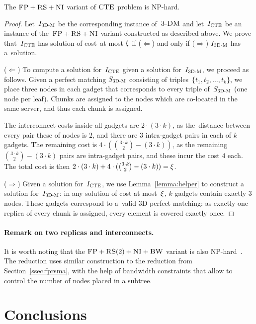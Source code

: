 \begin{theorem}
\label{theorem:fp_rs_cc}
The $\textsc{FP}+\textsc{RS}+\textsc{NI}$ variant of $\textsc{CTE}$ problem is NP-hard.
\end{theorem}
\begin{proof}
Let~$I_{\mathrm{\textsc{3D-M}}}$ be the corresponding instance of~$\textsc{3-DM}$ and let~$I_{\mathrm{\textsc{CTE}}}$ be an instance of
the~$\textsc{FP}+\textsc{RS}+\textsc{NI}$ variant constructed as described above.
We prove that~$I_{\mathrm{\textsc{CTE}}}$ has solution of cost~at most $\xi$ if ($\Leftarrow$) and only if
($\Rightarrow$)
$I_{\mathrm{\textsc{3D-M}}}$ has a~solution.

($\Leftarrow$) To compute a solution
for~$I_{\mathrm{\textsc{CTE}}}$ given a solution for~$I_{\mathrm{\textsc{3D-M}}}$, we proceed as follows.
Given a perfect matching $S_{\mathrm{\textsc{3D-M}}}$ consisting of triples~$ \{t_1, t_2,
\ldots, t_k\}$, we place three nodes in each gadget that
corresponds to every triple of~$S_{\mathrm{\textsc{3D-M}}}$ (one node per leaf). Chunks are assigned to the nodes which are co-located
in the same server, and thus each chunk is assigned.

The interconnect costs inside all gadgets are $2\cdot (3 \cdot k)$,
as the~distance between every pair these of nodes is $2$, and there are $3$ intra-gadget pairs in each of $k$ gadgets.
The remaining cost is $4\cdot({ 3\cdot k \choose 2} - (3\cdot k))$, as the remaining ${ 3\cdot k \choose 2} - (3\cdot k)$ pairs are intra-gadget pairs, and these incur the cost $4$ each.
The total cost is then $2\cdot (3\cdot k) + 4\cdot({ 3\cdot k \choose 2} - (3\cdot k)) = \xi$.

($\Rightarrow$) Given a solution for~$I_{\mathrm{\textsc{CTE}}}$,
we use Lemma~\ref{lemma:helper} to construct a solution for~$I_{\mathrm{\textsc{3D-M}}}$: in any solution of cost at most~$\xi$,
$k$ gadgets contain exactly 3 nodes. These gadgets correspond to a~valid
3D perfect matching: as exactly one replica of every chunk is assigned, every element is covered exactly once.
\end{proof}

\paragraph{Remark on two replicas and interconnects.}
It is worth noting that the $\textsc{FP}+\textsc{RS}(2)+\textsc{NI}+\textsc{BW}$ variant is also NP-hard~\cite{my-tcs}.
The reduction uses similar construction to the reduction from Section~\ref{ssec:fprsma},
with the help of bandwidth constraints that allow to control the number of nodes placed in a subtree.

\section{Conclusions}\label{sec:conclusion-static}


